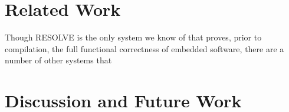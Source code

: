\section{Related Work}

Though RESOLVE is the only system we know of that proves, prior to compilation, the full functional correctness of embedded software, there are a number of other systems that 




\section{Discussion and Future Work}

